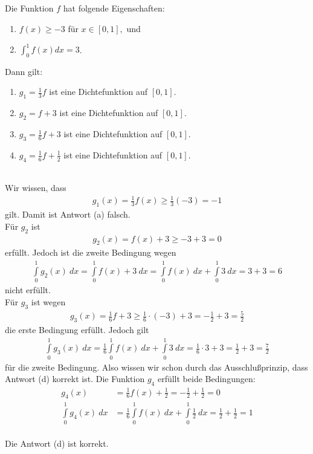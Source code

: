 \newpage

\subsection*{}
Die Funktion $f$ hat folgende Eigenschaften:
\renewcommand{\labelenumi}{(\roman{enumi})}
\begin{enumerate}
\item $f(x) \geq -3 $ für $x \in [0,1],$ und
\item $\int_0^1 f(x) dx = 3$.
\end{enumerate}
Dann gilt:
\renewcommand{\labelenumi}{(\alph{enumi})}
\begin{enumerate}
\item $g_1  =  \frac{1}{3} f $ ist eine Dichtefunktion auf $[0,1]$.
\item $g_2  =   f +3 $ ist eine Dichtefunktion auf $[0,1]$.
\item
$g_3  =  \frac{1}{6} f +3 $ ist eine Dichtefunktion auf $[0,1]$.
\item
$g_4  =  \frac{1}{6} f + \frac{1}{2} $ ist eine Dichtefunktion auf $[0,1]$.
\end{enumerate}
\ \\
Wir wissen, dass
\begin{align*}
g_1(x) = \frac{1}{3} f(x) \geq \frac{1}{3} (-3) = -1
\end{align*}
gilt.
Damit ist Antwort (a) falsch.\\
Für $g_2$ ist
\begin{align*}
g_2(x) = f(x) + 3 \geq -3 +3 = 0
\end{align*}
erfüllt. Jedoch ist die zweite Bedingung wegen
\begin{align*}
\int \limits_0^1 g_2(x) \ dx 
= 
\int \limits_0^1 f(x) + 3 \ dx
=
\int \limits_0^1 f(x) \ dx + \int \limits_0^1 3 \ dx
=
3 + 3 = 6
\end{align*}
nicht erfüllt.\\
Für $g_3$ ist wegen 
\begin{align*}
g_3(x) = \frac{1}{6} f + 3 \geq \frac{1}{6} \cdot (-3) +3
= -\frac{1}{2} +3 = \frac{5}{2}
\end{align*}
die erste Bedingung erfüllt.
Jedoch gilt
\begin{align*}
\int \limits_0^1 g_3(x) \ dx
= 
\frac{1}{6} \int \limits_0^1 f(x) \ dx + \int \limits_0^1 3 \ dx
= 
\frac{1}{6} \cdot 3 +  3 = \frac{1}{2} + 3 = \frac{7}{2}
\end{align*}
für die zweite Bedingung.
Also wissen wir schon durch das Ausschlußprinzip, dass Antwort (d) korrekt ist.
Die Funktion $g_4$ erfüllt beide Bedingungen:
\begin{align*}
g_4(x) &= \frac{1}{6} f(x) + \frac{1}{2}
= - \frac{1}{2} + \frac{1}{2} = 0\\
\int \limits_0^1 g_4(x) \ dx &=
\frac{1}{6} \int \limits_0^1 f(x) \ dx + \int \limits_0^1 \frac{1}{2} \ dx
= \frac{1}{2} + \frac{1}{2} = 1
\end{align*}
\ \\
Die Antwort (d) ist korrekt.

